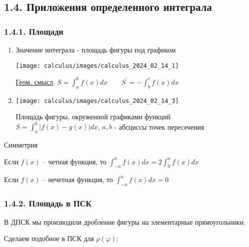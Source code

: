 \documentclass[12pt]{article}
\begin{document}
    \subsection{1.4. Приложения определенного интеграла}
    \hypertarget{integralapplications}{}

    \subsubsection{1.4.1. Площади}

    \begin{enumerate}[label*=\arabic** ]
        \item \Mem \hypertarget{integralareadpsk}{Значение интеграла} - площадь фигуры под графиком

        \begin{center}
            \texttt{[image: calculus/images/calculus\_2024\_02\_14\_1]}
        \end{center}

        \underline{Геом. смысл}. $S = \int_a^b f(x) dx \quad\quad S^\prime = -\int_b^c f(x)dx$

        \mediumvspace

        \item

        \begin{center}
            \texttt{[image: calculus/images/calculus\_2024\_02\_14\_3]}
        \end{center}

        Площадь фигуры, окруженной графиками функций $S = \int_a^b |f(x) - g(x)| dx$, $a, b$ - абсциссы точек пересечения
    \end{enumerate}

    \Nota Симметрия

    Если $f(x)$ -- четная функция, то $\int_{-a}^a f(x) dx = 2 \int_0^a f(x)dx$

    Если $f(x)$ -- нечетная функция, то $\int_{-a}^a f(x) dx = 0$

    \subsubsection{1.4.2. Площадь в ПСК}

    \hypertarget{integralareapsk}{В ДПСК мы производили дробление фигуры на элементарные прямоугольники.} Сделаем подобное в ПСК для $\rho(\varphi)$:
\end{document}
